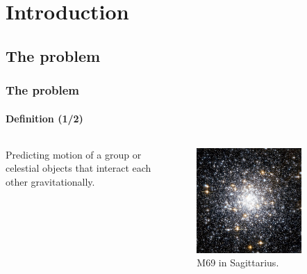 \section{Introduction}

\subsection{The {\nbody} problem}
\begin{frame}
    \frametitle{The {\nbody} problem}
    \framesubtitle{Definition (1/2)}

    \begin{columns}
        \begin{column}{0.6\textwidth}
                \begin{block}{}
            \begin{center}
                Predicting motion of a group or celestial objects that interact
                each other gravitationally.
            \end{center}
            \end{block}
        \end{column}
        \begin{column}{0.4\textwidth}
        \begin{figure}
            \centering
            \includegraphics[width=0.8\textwidth]{img/m69}
            \caption{M69 in Sagittarius.}
            \label{fig:m69}
        \end{figure}
        \end{column}
    \end{columns}

\end{frame}

